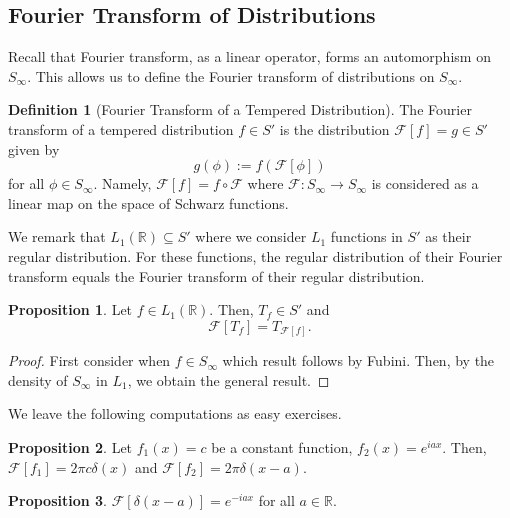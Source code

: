 \documentclass[]{article}
\theoremstyle{definition}
\theoremstyle{definition}
\newtheorem{definition}{Definition}[section]
\newtheorem{proposition}{Proposition}[section]
\begin{document}
\subsection{Fourier Transform of Distributions}

Recall that Fourier transform, as a linear operator, forms an automorphism 
on \(S_\infty\). This allows us to define the Fourier transform of 
distributions on \(S_\infty\). 

\begin{definition}[Fourier Transform of a Tempered Distribution]
  The Fourier transform of a tempered distribution \(f \in S'\) is the distribution 
  \(\mathcal{F}[f] = g \in S'\) given by 
  \[g(\phi) := f(\mathcal{F}[\phi])\]
  for all \(\phi \in S_\infty\). Namely, \(\mathcal{F}[f] = f \circ \mathcal{F}\)
  where \(\mathcal{F} : S_\infty \to S_\infty\) is considered as a linear map 
  on the space of Schwarz functions.
\end{definition}

We remark that \(L_1(\mathbb{R}) \subseteq S'\) where we consider \(L_1\)
functions in \(S'\) as their regular distribution. For these functions, 
the regular distribution of their Fourier transform equals the Fourier 
transform of their regular distribution. 

\begin{proposition}
  Let \(f \in L_1(\mathbb{R})\). Then, \(T_f \in S'\) and 
  \[\mathcal{F}[T_f] = T_{\mathcal{F}[f]}.\]
\end{proposition}
\begin{proof}
  First consider when \(f \in S_\infty\) which result follows by Fubini. 
  Then, by the density of \(S_\infty\) in \(L_1\), we obtain the general 
  result.
\end{proof}

We leave the following computations as easy exercises.

\begin{proposition}
  Let \(f_1(x) = c\) be a constant function, \(f_2(x) = e^{iax}\). 
  Then, \(\mathcal{F}[f_1] = 2\pi c \delta(x)\) and 
  \(\mathcal{F}[f_2] = 2\pi \delta(x - a)\).
\end{proposition}

\begin{proposition}
  \(\mathcal{F}[\delta(x - a)] = e^{-iax}\) for all \(a \in \mathbb{R}\). 
\end{proposition}
\end{document}
